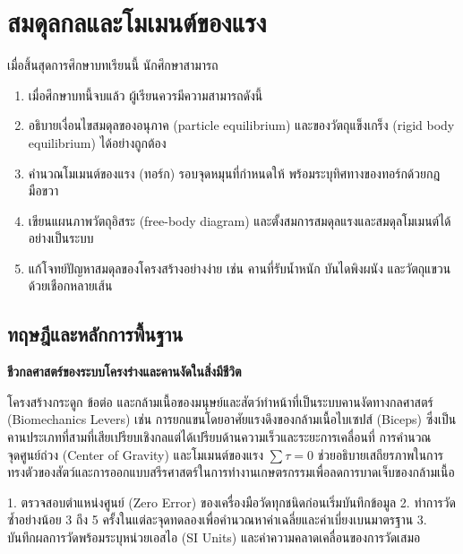 \chapter{สมดุลกลและโมเมนต์ของแรง}
\label{ch:ch06_equilibrium}

\begin{conceptbox}[title=วัตถุประสงค์การเรียนรู้ประจำบท]
เมื่อสิ้นสุดการศึกษาบทเรียนนี้ นักศึกษาสามารถ
\begin{enumerate}
    \item เมื่อศึกษาบทนี้จบแล้ว ผู้เรียนควรมีความสามารถดังนี้
    \item อธิบายเงื่อนไขสมดุลของอนุภาค (particle equilibrium) และของวัตถุแข็งเกร็ง (rigid body equilibrium) ได้อย่างถูกต้อง
    \item คำนวณโมเมนต์ของแรง (ทอร์ก) รอบจุดหมุนที่กำหนดให้ พร้อมระบุทิศทางของทอร์กด้วยกฎมือขวา
    \item เขียนแผนภาพวัตถุอิสระ (free-body diagram) และตั้งสมการสมดุลแรงและสมดุลโมเมนต์ได้อย่างเป็นระบบ
    \item แก้โจทย์ปัญหาสมดุลของโครงสร้างอย่างง่าย เช่น คานที่รับน้ำหนัก บันไดพิงผนัง และวัตถุแขวนด้วยเชือกหลายเส้น
\end{enumerate}
\end{conceptbox}

\section{ทฤษฎีและหลักการพื้นฐาน}

\begin{bioappbox}
\textbf{ชีวกลศาสตร์ของระบบโครงร่างและคานงัดในสิ่งมีชีวิต}

โครงสร้างกระดูก ข้อต่อ และกล้ามเนื้อของมนุษย์และสัตว์ทำหน้าที่เป็นระบบคานงัดทางกลศาสตร์ (Biomechanics Levers) เช่น การยกแขนโดยอาศัยแรงดึงของกล้ามเนื้อไบเซปส์ (Biceps) ซึ่งเป็นคานประเภทที่สามที่เสียเปรียบเชิงกลแต่ได้เปรียบด้านความเร็วและระยะการเคลื่อนที่ การคำนวณจุดศูนย์ถ่วง (Center of Gravity) และโมเมนต์ของแรง $\sum \tau = 0$ ช่วยอธิบายเสถียรภาพในการทรงตัวของสัตว์และการออกแบบสรีรศาสตร์ในการทำงานเกษตรกรรมเพื่อลดการบาดเจ็บของกล้ามเนื้อ
\end{bioappbox}

\begin{labbox}
1. ตรวจสอบตำแหน่งศูนย์ (Zero Error) ของเครื่องมือวัดทุกชนิดก่อนเริ่มบันทึกข้อมูล
2. ทำการวัดซ้ำอย่างน้อย 3 ถึง 5 ครั้งในแต่ละจุดทดลองเพื่อคำนวณหาค่าเฉลี่ยและค่าเบี่ยงเบนมาตรฐาน
3. บันทึกผลการวัดพร้อมระบุหน่วยเอสไอ (SI Units) และค่าความคลาดเคลื่อนของการวัดเสมอ
\end{labbox}

